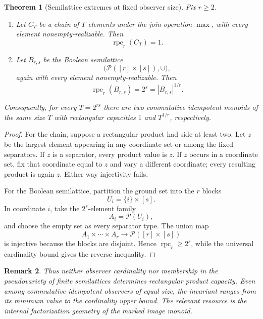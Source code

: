\documentclass[11pt]{article}
\newtheorem{theorem}{Theorem}[section]
\newtheorem{remark}[theorem]{Remark}
\begin{document}
\begin{theorem}[Semilattice extremes at fixed observer size]
\label{thm:rpc-semilattice-extremes}
Fix \(r\ge2\).

\begin{enumerate}
\item Let \(C_T\) be a chain of \(T\) elements under the join operation
\(\max\), with every element nonempty-realizable. Then
\[
 \operatorname{rpc}_r(C_T)=1.
\]

\item Let \(B_{r,s}\) be the Boolean semilattice
\[
 \bigl(\mathcal P([r]\times[s]),\cup\bigr),
\]
again with every element nonempty-realizable. Then
\[
 \operatorname{rpc}_r(B_{r,s})=2^s
 =|B_{r,s}|^{1/r}.
\]
\end{enumerate}

Consequently, for every \(T=2^{rs}\) there are two commutative idempotent
monoids of the same size \(T\) with rectangular capacities \(1\) and
\(T^{1/r}\), respectively.
\end{theorem}

\begin{proof}
For the chain, suppose a rectangular product had side at least two.  Let
\(z\) be the largest element appearing in any coordinate set or among the
fixed separators.  If \(z\) is a separator, every product value is \(z\).
If \(z\) occurs in a coordinate set, fix that coordinate equal to \(z\) and
vary a different coordinate; every resulting product is again \(z\).
Either way injectivity fails.

For the Boolean semilattice, partition the ground set into the \(r\) blocks
\[
 U_i=\{i\}\times[s].
\]
In coordinate \(i\), take the \(2^s\)-element family
\[
 A_i=\mathcal P(U_i),
\]
and choose the empty set as every separator type.  The union map
\[
 A_1\times\cdots\times A_r\to\mathcal P([r]\times[s])
\]
is injective because the blocks are disjoint.  Hence
\(\operatorname{rpc}_r\ge2^s\), while the universal cardinality bound gives
the reverse inequality.
\end{proof}

\begin{remark}
Thus neither observer cardinality nor membership in the pseudovariety of
finite semilattices determines rectangular product capacity.  Even among
commutative idempotent observers of equal size, the invariant ranges from
its minimum value to the cardinality upper bound.  The relevant resource is
the internal factorization geometry of the marked image monoid.
\end{remark}
\end{document}

